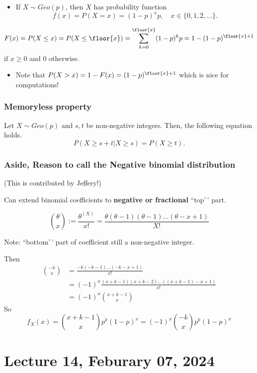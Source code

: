 \documentclass[
]{book}
\providecommand{\tightlist}{%
  \setlength{\itemsep}{0pt}\setlength{\parskip}{0pt}}
\theoremstyle{definition}
\theoremstyle{definition}
\theoremstyle{definition}
\theoremstyle{definition}
\theoremstyle{remark}
\begin{document}
\begin{itemize}
\tightlist
\item
  If \(X\sim Geo(p)\), then \(X\) has probability function
  \[ f(x) = P(X=x)= (1-p)^x p,\quad x\in\{0,1,2,\dots\}.\]
\end{itemize}

\[ F(x)=P(X\leq x) 
= P(X\leq \floor{x}) = 
\sum_{k=0}^{\floor{x}} (1-p)^k p =
1-(1-p)^{\floor{x}+1}\]
if \(x\geq 0\) and \(0\) otherwise.

\begin{itemize}
\tightlist
\item
  Note that \(P(X>x)=1-F(x)=(1-p)^{\floor{x}+1}\) which is nice for computations!
\end{itemize}

\subsection{Memoryless property}\label{memoryless-property}

Let \(X \sim Geo(p)\) and \(s,t\) be non-negative integers. Then, the following equation holds.
\[
P(X \geq s+t | X \geq s) = P(X \geq t).
\]

\subsection{Aside, Reason to call the Negative binomial distribution}\label{aside-reason-to-call-the-negative-binomial-distribution}

(This is contributed by Jeffery!)

Can extend binomial coefficients to \textbf{negative or fractional} ``top'\,' part.

\[\binom{\theta}{x} := \frac{\theta^{(X)}}{x!} = \frac{\theta(\theta-1)(\theta-1)...(\theta-x+1)}{X!}\]

Note: ``bottom'\,' part of coefficient still a non-negative integer.

Then
\begin{align*}
    \binom{-k}{x} 
        & = \frac{-k(-k-1)...(-k-x+1)}{x!} \\
        & = (-1)^x \frac{(x+k-1)(x+k-2)...((x+k-1)-x+1)}{x!}\\
        & = (-1)^x \binom{x+k-1}{x}
\end{align*}
So
\[
    f_X(x) = \binom{x+k-1}{x}p^k(1-p)^x = (-1)^x \binom{-k}{x} p^k(1-p)^x 
\]

\chapter{Lecture 14, Feburary 07, 2024}\label{lecture-14-feburary-07-2024}
\end{document}
